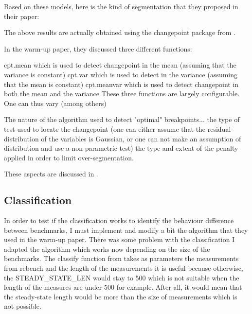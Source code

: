 \documentclass{article}
\begin{document}
Based on these models, here is the kind of segmentation that they proposed in their paper:

The above results are actually obtained using the changepoint package from \citep{killick2014changepoint}.

In the warm-up paper, they discussed three different functions:

cpt.mean which is used to detect changepoint in the mean (assuming that the variance is constant)
cpt.var which is used to detect  in the variance (assuming that the mean is constant)
cpt.meanvar which is used to detect changepoint in both the mean and the variance
These three functions are largely configurable. One can thus vary (among others)

The nature of the algorithm used to detect "optimal" breakpoints...
the type of test used to locate the changepoint (one can either assume that the residual distribution of the variables is Gaussian, or one can not make an assumption of distribution and use a non-parametric test)
the type and extent of the penalty applied in order to limit over-segmentation.

These aspects are discussed in \citep{killick2014changepoint}.

\subsection{Classification}

In order to test if the classification works to identify the behaviour difference between benchmarks, I must implement and modify a bit the algorithm that they used in the warm-up paper.
There was some problem with the classification I adapted the algorithm which works now depending on the size of the benchmarks.
The classify function from \citep{barrett2017virtual} takes as parameters the measurements from rebench and the length of the measurements it is useful because otherwise, the STEADY\_STATE\_LEN would stay to 500 which is not suitable when the length of the measures are under 500 for example. After all, it would mean that the steady-state length would be more than the size of measurements which is not possible.
\end{document}
